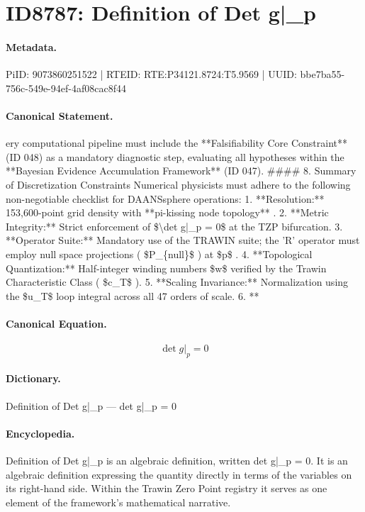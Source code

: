 \section*{ID8787: Definition of Det g|\_p}
\paragraph{Metadata.}
PiID: 9073860251522 | RTEID: RTE:P34121.8724:T5.9569 | UUID: bbe7ba55-756c-549e-94ef-4af08cac8f44

\paragraph{Canonical Statement.}
ery computational pipeline must include the **Falsifiability Core Constraint** (ID 048) as a mandatory diagnostic step, evaluating all hypotheses within the **Bayesian Evidence Accumulation Framework** (ID 047). \#\#\#\# 8. Summary of Discretization Constraints Numerical physicists must adhere to the following non-negotiable checklist for DAANSsphere operations: 1. **Resolution:** 153,600-point grid density with **pi-kissing node topology** . 2. **Metric Integrity:** Strict enforcement of \$\textbackslash{}det g|\_p = 0\$ at the TZP bifurcation. 3. **Operator Suite:** Mandatory use of the TRAWIN suite; the 'R' operator must employ null space projections ( \$P\_\{null\}\$ ) at \$p\$ . 4. **Topological Quantization:** Half-integer winding numbers \$w\$ verified by the Trawin Characteristic Class ( \$c\_T\$ ). 5. **Scaling Invariance:** Normalization using the \$u\_T\$ loop integral across all 47 orders of scale. 6. **

\paragraph{Canonical Equation.}
\[
\det g|_p = 0
\]

\paragraph{Dictionary.}
Definition of Det g|\_p — det g|\_p = 0

\paragraph{Encyclopedia.}
Definition of Det g|\_p is an algebraic definition, written det g|\_p = 0. It is an algebraic definition expressing the quantity directly in terms of the variables on its right-hand side. Within the Trawin Zero Point registry it serves as one element of the framework's mathematical narrative.
